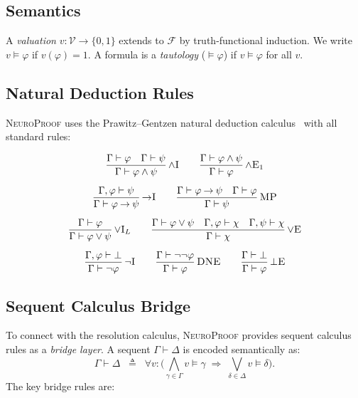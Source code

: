 \documentclass[conference]{IEEEtran}
\newcommand{\entails}{\vDash}
\newcommand{\proves}{\vdash}
\newcommand{\dland}{\mathbin{\wedge}}
\newcommand{\dlor}{\mathbin{\vee}}
\newcommand{\dlnot}{\neg}
\newcommand{\dlimp}{\mathbin{\to}}
\newcommand{\dlbot}{\bot}
\newcommand{\Fml}{\mathcal{F}}
\newcommand{\NP}{\textsc{NeuroProof}}
\newcommand{\infrule}[3]{
  \dfrac{\displaystyle #2}{\displaystyle #3}\,\textsc{#1}
}
\begin{document}
\subsection{Semantics}

A \emph{valuation} $v : \mathcal{V} \to \{0,1\}$ extends to $\Fml$
by truth-functional induction.  We write $v \entails \varphi$ if
$v(\varphi) = 1$.  A formula is a \emph{tautology} ($\entails \varphi$)
if $v \entails \varphi$ for all $v$.

\subsection{Natural Deduction Rules}

\NP{} uses the Prawitz--Gentzen natural deduction
calculus~\cite{Prawitz1965,Gentzen1969} with all standard rules:

\medskip
\begin{gather}
  \infrule{$\wedge$I}
    {\Gamma \proves \varphi \quad \Gamma \proves \psi}
    {\Gamma \proves \varphi \dland \psi}
  \qquad
  \infrule{$\wedge$E$_1$}
    {\Gamma \proves \varphi \dland \psi}
    {\Gamma \proves \varphi}
  \label{eq:and-rules}
  \\[6pt]
  \infrule{$\to$I}
    {\Gamma, \varphi \proves \psi}
    {\Gamma \proves \varphi \dlimp \psi}
  \qquad
  \infrule{MP}
    {\Gamma \proves \varphi \dlimp \psi \quad \Gamma \proves \varphi}
    {\Gamma \proves \psi}
  \label{eq:imp-rules}
  \\[6pt]
  \infrule{$\vee$I$_L$}
    {\Gamma \proves \varphi}
    {\Gamma \proves \varphi \dlor \psi}
  \qquad
  \infrule{$\vee$E}
    {\Gamma \proves \varphi \dlor \psi \quad
     \Gamma, \varphi \proves \chi \quad
     \Gamma, \psi \proves \chi}
    {\Gamma \proves \chi}
  \label{eq:or-rules}
  \\[6pt]
  \infrule{$\dlnot$I}
    {\Gamma, \varphi \proves \dlbot}
    {\Gamma \proves \dlnot\varphi}
  \qquad
  \infrule{DNE}
    {\Gamma \proves \dlnot\dlnot\varphi}
    {\Gamma \proves \varphi}
  \qquad
  \infrule{$\dlbot$E}
    {\Gamma \proves \dlbot}
    {\Gamma \proves \varphi}
  \label{eq:not-rules}
\end{gather}

\subsection{Sequent Calculus Bridge}

To connect with the resolution calculus, \NP{} provides sequent
calculus rules as a \emph{bridge layer}.  A sequent
$\Gamma \proves \Delta$ is encoded semantically as:
\begin{equation}
  \Gamma \proves \Delta \;\;\triangleq\;\;
  \forall v:\bigl(\textstyle\bigwedge_{\gamma \in \Gamma}
    v \entails \gamma \;\Rightarrow\;
    \textstyle\bigvee_{\delta \in \Delta} v \entails \delta\bigr).
\end{equation}
The key bridge rules are:
\end{document}
